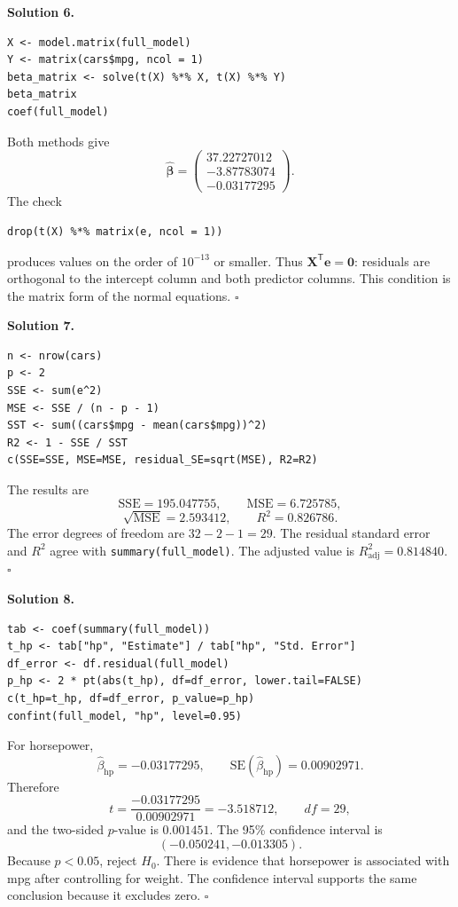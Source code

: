 \documentclass[11pt]{article}
\newenvironment{answer}[1]
 {\par\medskip\noindent\color{green}\textbf{Solution #1.}\color{black}\ }
 {\hfill$\square$\par\medskip}
\begin{document}
\begin{answer}{6}
\begin{lstlisting}
X <- model.matrix(full_model)
Y <- matrix(cars$mpg, ncol = 1)
beta_matrix <- solve(t(X) %*% X, t(X) %*% Y)
beta_matrix
coef(full_model)
\end{lstlisting}
Both methods give
\[
 \widehat{\boldsymbol\beta}
 =\begin{pmatrix}
 37.22727012\\-3.87783074\\-0.03177295
 \end{pmatrix}.
\]
The check
\begin{lstlisting}
drop(t(X) %*% matrix(e, ncol = 1))
\end{lstlisting}
produces values on the order of $10^{-13}$ or smaller. Thus
$\mathbf X^{\mathsf T}\mathbf e=\mathbf0$: residuals are orthogonal to the
intercept column and both predictor columns. This condition is the matrix form
of the normal equations.
\end{answer}

\begin{answer}{7}
\begin{lstlisting}
n <- nrow(cars)
p <- 2
SSE <- sum(e^2)
MSE <- SSE / (n - p - 1)
SST <- sum((cars$mpg - mean(cars$mpg))^2)
R2 <- 1 - SSE / SST
c(SSE=SSE, MSE=MSE, residual_SE=sqrt(MSE), R2=R2)
\end{lstlisting}
The results are
\[
 \mathrm{SSE}=195.047755,
 \qquad
 \mathrm{MSE}=6.725785,
\]
\[
 \sqrt{\mathrm{MSE}}=2.593412,
 \qquad
 R^2=0.826786.
\]
The error degrees of freedom are $32-2-1=29$. The residual standard error and
$R^2$ agree with \texttt{summary(full\_model)}. The adjusted value is
$R^2_{\mathrm{adj}}=0.814840$.
\end{answer}

\begin{answer}{8}
\begin{lstlisting}
tab <- coef(summary(full_model))
t_hp <- tab["hp", "Estimate"] / tab["hp", "Std. Error"]
df_error <- df.residual(full_model)
p_hp <- 2 * pt(abs(t_hp), df=df_error, lower.tail=FALSE)
c(t_hp=t_hp, df=df_error, p_value=p_hp)
confint(full_model, "hp", level=0.95)
\end{lstlisting}
For horsepower,
\[
 \widehat\beta_{\mathrm{hp}}=-0.03177295,
 \qquad
 \mathrm{SE}(\widehat\beta_{\mathrm{hp}})=0.00902971.
\]
Therefore
\[
 t=\frac{-0.03177295}{0.00902971}=-3.518712,
 \qquad df=29,
\]
and the two-sided $p$-value is $0.001451$. The 95\% confidence interval is
\[
 (-0.050241,-0.013305).
\]
Because $p<0.05$, reject $H_0$. There is evidence that horsepower is associated
with mpg after controlling for weight. The confidence interval supports the
same conclusion because it excludes zero.
\end{answer}
\end{document}
